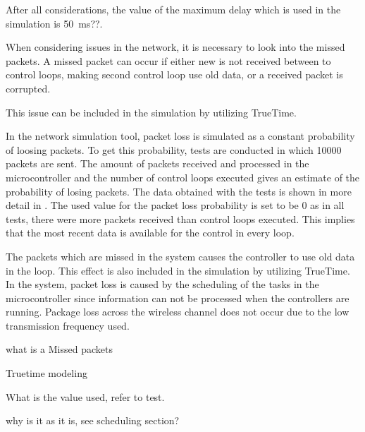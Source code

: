 After all considerations, the value of the maximum delay which is used in the simulation is \SI{50}{ms}??.

When considering issues in the network, it is necessary to look into the missed packets. A missed packet can occur if either new is not received between to control loops, making second control loop use old data, or a received packet is corrupted.

This issue can be included in the simulation by utilizing TrueTime.

In the network simulation tool, packet loss is simulated as a constant probability of loosing packets. To get this probability, tests are conducted in which 10000 packets are sent. The amount of packets received and processed in the microcontroller and the number of control loops executed gives an estimate of the probability of losing packets. The data obtained with the tests is shown in more detail in . The used value for the packet loss probability is set to be 0 as in all tests, there were more packets received than control loops executed. This implies that the most recent data is available for the control in every loop.

The packets which are missed in the system causes the controller to use old data in the loop. This effect is also included in the simulation by utilizing TrueTime. In the system, packet loss is caused by the scheduling of the tasks in the microcontroller since information can not be processed when the controllers are running. Package loss across the wireless channel does not occur due to the low transmission frequency used.



what is a Missed packets

Truetime modeling

What is the value used, refer to test.

why is it as it is, see scheduling section?



 


